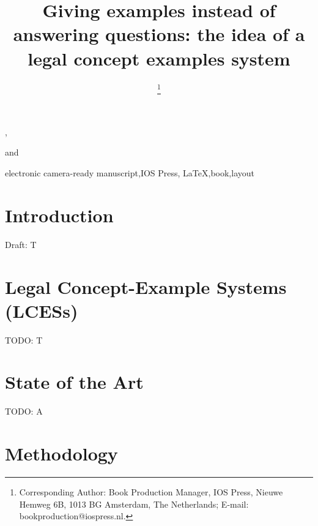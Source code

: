 \documentclass{IOS-Book-Article}
\begin{document}
\begin{frontmatter}              %

\title{Giving examples instead of answering questions: the idea of a legal concept examples system}

\author[A]{ %
\thanks{Corresponding Author: Book Production Manager, IOS Press, Nieuwe Hemweg 6B,
1013 BG Amsterdam, The Netherlands; E-mail:
bookproduction@iospress.nl.}},
\author[B]{ }
and
\author[B]{ }

\address[A]{Book Production Department, IOS Press, The Netherlands}
\address[B]{Short Affiliation of Second Author and Third Author}

\begin{abstract}

\end{abstract}

\begin{keyword}
electronic camera-ready manuscript\sep IOS Press\sep
\LaTeX\sep book\sep layout
\end{keyword}
\end{frontmatter}

\thispagestyle{empty}
\pagestyle{empty}

\section{Introduction}

Draft: T



\section{Legal Concept-Example Systems (LCESs)}
\label{sec:lces}

TODO: T



\section{State of the Art}
\label{sec:sota}

TODO: A



\section{Methodology}
\label{sec:method}
\end{document}

